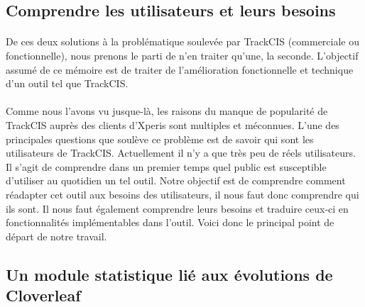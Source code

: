 		\subsection{Comprendre les utilisateurs et leurs besoins}
			\paragraph{}%
			De ces deux solutions à la problématique soulevée par TrackCIS (commerciale
			ou fonctionnelle), nous prenons le parti de n'en traiter qu'une, la
			seconde.\newline
			L'objectif assumé de ce mémoire est de traiter de l'amélioration
			fonctionnelle et technique d'un outil tel que TrackCIS.
			
			\paragraph{}%
			Comme nous l'avons vu jusque-là, les raisons du manque de
			popularité de TrackCIS auprès des clients d'Xperis sont multiples et
			méconnues. L'une des principales questions que soulève ce problème est de
			savoir qui sont les utilisateurs de TrackCIS. Actuellement il n'y a que très
			peu de réels utilisateurs. Il s'agit de comprendre dans un premier temps quel
			public est susceptible d'utiliser au quotidien un tel outil. Notre objectif
			est de comprendre comment réadapter cet outil aux besoins des utilisateurs,
			il nous faut donc comprendre qui ils sont. Il nous faut également comprendre
			leurs besoins et traduire ceux-ci en fonctionnalités implémentables dans
			l'outil. Voici donc le principal point de départ de notre travail.
			
		\subsection{Un module statistique lié aux évolutions de Cloverleaf}
